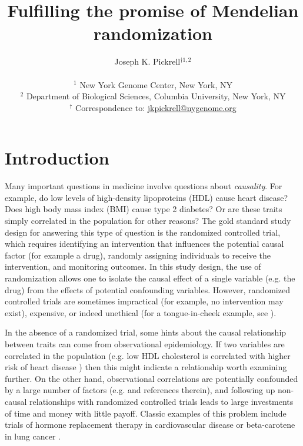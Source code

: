 \documentclass[11pt,titlepage]{article}
\begin{document}
\title{Fulfilling the promise of Mendelian randomization}
\author{Joseph K. Pickrell$^{\dagger 1,2}$\\ \\
\small $^1$ New York Genome Center, New York, NY\\
\small $^2$ Department of Biological Sciences, Columbia University, New York, NY \\
\small $^\dagger$ Correspondence to: \url{jkpickrell@nygenome.org}
}
\maketitle
\clearpage
\section{Introduction}
Many important questions in medicine involve questions about \emph{causality}. For example, do low levels of high-density lipoproteins (HDL) cause heart disease? Does high body mass index (BMI) cause type 2 diabetes? Or are these traits simply correlated in the population for other reasons? The gold standard study design for answering this type of question is the randomized controlled trial, which requires identifying an intervention that influences the potential causal factor (for example a drug), randomly assigning individuals to receive the intervention, and monitoring outcomes. In this study design, the use of randomization allows one to isolate the causal effect of a single variable (e.g. the drug) from the effects of potential confounding variables. However, randomized controlled trials are sometimes impractical (for example, no intervention may exist), expensive, or indeed unethical (for a tongue-in-cheek example, see \citet{Smith:2003aa}). 

In the absence of a randomized trial, some hints about the causal relationship between traits can come from observational epidemiology. If two variables are correlated in the population (e.g. low HDL cholesterol is correlated with higher risk of heart disease \citep{Gordon:1977aa}) then this might indicate a relationship worth examining further. On the other hand, observational correlations are potentially confounded by a large number of factors (e.g. \citet{Taubes:1995aa} and references therein), and following up non-causal relationships with randomized controlled trials leads to large investments of time and money with little payoff. Classic examples of this problem include trials of hormone replacement therapy in cardiovascular disease \citep{Rossouw:2002aa} or beta-carotene in lung cancer \cite{:1994ab}.
\end{document}

